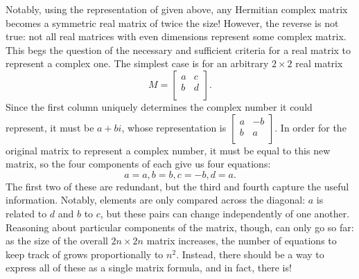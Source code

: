 \documentclass{article}
\begin{document}
Notably, using the representation of given above,
any Hermitian complex matrix becomes a symmetric real matrix of twice the size!
However, the reverse is not true:
not all real matrices with even dimensions represent some complex matrix.
This begs the question of the necessary and sufficient criteria
for a real matrix to represent a complex one.
The simplest case is for an arbitrary $2 \times 2$ real matrix
\[
M=
\begin{bmatrix}
  a & c \\
  b & d \\
\end{bmatrix}.
\]
Since the first column uniquely determines the complex number it could represent,
it must be $a+bi$, whose representation is
$\begin{bmatrix}
  a & -b \\
  b & a \\
\end{bmatrix}$.
In order for the original matrix to represent a complex number,
it must be equal to this new matrix,
so the four components of each give us four equations:
\[a = a, b = b, c = -b, d = a.\]
The first two of these are redundant,
but the third and fourth capture the useful information.
Notably, elements are only compared across the diagonal:
$a$ is related to $d$ and $b$ to $c$,
but these pairs can change independently of one another.
Reasoning about particular components of the matrix, though, can only go so far:
as the size of the overall $2n \times 2n$ matrix increases,
the number of equations to keep track of grows proportionally to $n^2$.
Instead, there should be a way to express all of these as a single matrix formula,
and in fact, there is!
\end{document}
